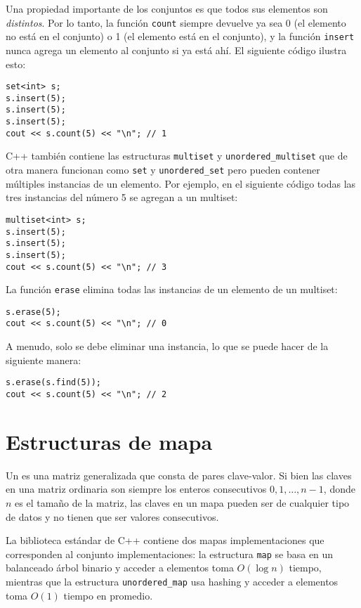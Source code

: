 Una propiedad importante de los conjuntos es
que todos sus elementos son \emph{distintos}.
Por lo tanto, la función \texttt{count} siempre devuelve
ya sea 0 (el elemento no está en el conjunto)
o 1 (el elemento está en el conjunto),
y la función \texttt{insert} nunca agrega
un elemento al conjunto si ya está
ahí.
El siguiente código ilustra esto:

\begin{lstlisting}
set<int> s;
s.insert(5);
s.insert(5);
s.insert(5);
cout << s.count(5) << "\n"; // 1
\end{lstlisting}

C++ también contiene las estructuras
\texttt{multiset} y \texttt{unordered\_multiset}
que de otra manera funcionan como \texttt{set}
y \texttt{unordered\_set}
pero pueden contener múltiples instancias de un elemento.
Por ejemplo, en el siguiente código todas las tres instancias
del número 5 se agregan a un multiset:

\begin{lstlisting}
multiset<int> s;
s.insert(5);
s.insert(5);
s.insert(5);
cout << s.count(5) << "\n"; // 3
\end{lstlisting}
La función \texttt{erase} elimina
todas las instancias de un elemento
de un multiset:
\begin{lstlisting}
s.erase(5);
cout << s.count(5) << "\n"; // 0
\end{lstlisting}
A menudo, solo se debe eliminar una instancia,
lo que se puede hacer de la siguiente manera:
\begin{lstlisting}
s.erase(s.find(5));
cout << s.count(5) << "\n"; // 2
\end{lstlisting}

\section{Estructuras de mapa}


Un  es una matriz generalizada
que consta de pares clave-valor.
Si bien las claves en una matriz ordinaria son siempre
los enteros consecutivos $0,1,\ldots,n-1$,
donde $n$ es el tamaño de la matriz,
las claves en un mapa pueden ser de cualquier tipo de datos y
no tienen que ser valores consecutivos.

La biblioteca estándar de C++ contiene dos mapas
implementaciones que corresponden al conjunto
implementaciones: la estructura
\texttt{map} se basa en un balanceado
árbol binario y acceder a elementos
toma $O(\log n)$ tiempo,
mientras que la estructura
\texttt{unordered\_map} usa hashing
y acceder a elementos toma $O(1)$ tiempo en promedio.

